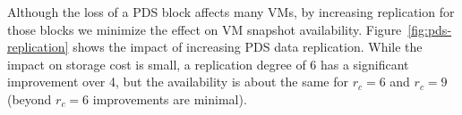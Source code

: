Although the loss of a PDS block affects many VMs,
by increasing replication for those blocks we minimize the effect on VM snapshot availability.
%
Figure~\ref{fig:pds-replication} shows
the impact of increasing PDS data replication. 
While the impact on storage cost is small, 
a replication degree of 6  has a significant improvement over 4, but the availability is about
the same for $r_c=6$ and $r_c=9$ (beyond $r_c=6$ improvements are minimal).
 

